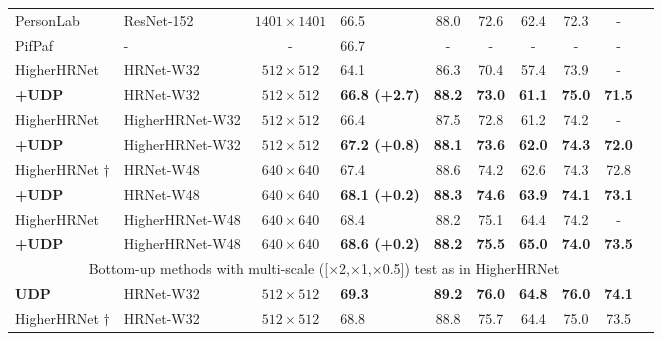 \documentclass[10pt,journal,compsoc]{IEEEtran}
\begin{document}
\begin{table*}
\begin{center}
\begin{tabular}{l|l|c|lcccccc}
PersonLab \cite{PersonLab}         & ResNet-152    &$1401\times1401$  &66.5                  & 88.0              & 72.6         & 62.4          &72.3           &-\\
PifPaf \cite{PIFPAF}               & -             &-                 &66.7                  & -                 & -            &-              &-              &-    \\
HigherHRNet \cite{Higher}          & HRNet-W32     &$512\times512$    &64.1                  & 86.3              & 70.4         & 57.4          &73.9           &-\\
\textbf{+UDP}                      & HRNet-W32     &$512\times512$    &\textbf{66.8 (+2.7)}         & \textbf{88.2}     & \textbf{73.0}& \textbf{61.1} &\textbf{75.0}  &\textbf{71.5}\\
HigherHRNet \cite{Higher}          &HigherHRNet-W32&$512\times512$    &66.4                  & 87.5              & 72.8         & 61.2          &74.2           &-\\
\textbf{+UDP}                      &HigherHRNet-W32&$512\times512$    &\textbf{67.2 (+0.8)}         & \textbf{88.1}     & \textbf{73.6}& \textbf{62.0} &\textbf{74.3}  &\textbf{72.0}\\
HigherHRNet \cite{Higher}$\dagger$ &HRNet-W48      &$640\times640$    &67.4                  & 88.6              & 74.2         & 62.6          &74.3           &72.8\\
\textbf{+UDP}                      &HRNet-W48      &$640\times640$    &\textbf{68.1 (+0.2)}         & \textbf{88.3}     & \textbf{74.6}& \textbf{63.9} &\textbf{74.1}  &\textbf{73.1}\\
HigherHRNet \cite{Higher}          &HigherHRNet-W48&$640\times640$    &68.4                  & 88.2              & 75.1         & 64.4          &74.2           &-\\
\textbf{+UDP}                      &HigherHRNet-W48&$640\times640$    &\textbf{68.6 (+0.2)}         & \textbf{88.2}     & \textbf{75.5}& \textbf{65.0} &\textbf{74.0}  &\textbf{73.5}\\
\hline
\multicolumn{9}{c}{Bottom-up methods with multi-scale ([$\times$2,$\times$1,$\times$0.5]) test as in HigherHRNet \cite{Higher} }\\
\hline
\textbf{UDP}                     &HRNet-W32      &$512\times512$    &\textbf{69.3}         & \textbf{89.2}     & \textbf{76.0}  & \textbf{64.8} &\textbf{76.0}  &\textbf{74.1}\\
HigherHRNet \cite{Higher}$\dagger$&HRNet-W32     &$512\times512$    &68.8                  & 88.8              & 75.7           & 64.4          &75.0           &73.5\\

\end{tabular}
\end{center}
\end{table*}
\end{document}
